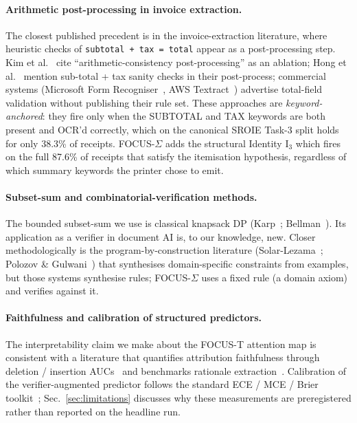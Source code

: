 \paragraph{Arithmetic post-processing in invoice extraction.}
The closest published precedent is in the invoice-extraction
literature, where heuristic checks of \texttt{subtotal + tax = total}
appear as a post-processing step.
Kim et al.~\cite{kim2022donut} cite ``arithmetic-consistency
post-processing'' as an ablation;
Hong et al.~\cite{hong2022bros} mention sub-total + tax sanity checks
in their post-process; commercial systems
(Microsoft Form Recogniser~\cite{azure-form-recogniser},
AWS Textract~\cite{aws-textract}) advertise total-field validation
without publishing their rule set.  These approaches are
\emph{keyword-anchored}: they fire only when the \textsf{SUBTOTAL}
and \textsf{TAX} keywords are both present and OCR'd correctly, which
on the canonical SROIE Task-3 split holds for only 38.3\% of
receipts.  FOCUS-$\Sigma$ adds the structural Identity $\mathrm{I}_3$
which fires on the full 87.6\% of receipts that satisfy the
itemisation hypothesis, regardless of which summary keywords the
printer chose to emit.

\paragraph{Subset-sum and combinatorial-verification methods.}
The bounded subset-sum we use is classical knapsack DP
(Karp~\cite{karp1972reducibility}; Bellman~\cite{bellman1957dynamic}).
Its application as a verifier in document AI is, to our knowledge,
new.  Closer methodologically is the program-by-construction
literature
(Solar-Lezama~\cite{solarlezama2008program};
Polozov \& Gulwani~\cite{polozov2015flashmeta}) that synthesises
domain-specific constraints from examples, but those systems
synthesise rules; FOCUS-$\Sigma$ uses a fixed rule (a domain axiom)
and verifies against it.

\paragraph{Faithfulness and calibration of structured predictors.}
The interpretability claim we make about the FOCUS-T attention map is
consistent with a literature that quantifies attribution faithfulness
through deletion / insertion AUCs~\cite{petsiuk2018rise} and
benchmarks rationale extraction~\cite{deyoung2020eraser}.
Calibration of the verifier-augmented predictor follows the standard
ECE / MCE / Brier toolkit~\cite{guo2017calibration,naeini2015ece,brier1950score};
Sec.~\ref{sec:limitations} discusses why these measurements are
preregistered rather than reported on the headline run.

